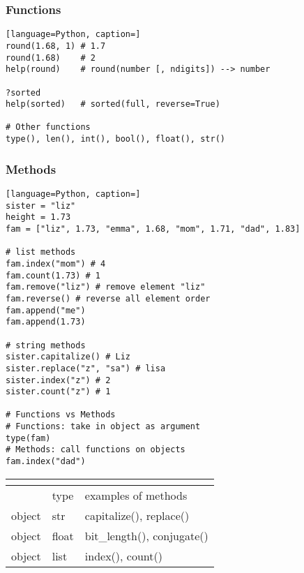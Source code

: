 \documentclass[12pt]{article}
\begin{document}
\subsubsection{\normalsize Functions}
\begin{lstlisting}[language=Python, caption=]
round(1.68, 1) # 1.7
round(1.68)    # 2
help(round)    # round(number [, ndigits]) --> number

?sorted
help(sorted)   # sorted(full, reverse=True)

# Other functions
type(), len(), int(), bool(), float(), str()
\end{lstlisting}

\subsubsection{\normalsize Methods}
\begin{lstlisting}[language=Python, caption=]
sister = "liz"
height = 1.73
fam = ["liz", 1.73, "emma", 1.68, "mom", 1.71, "dad", 1.83]

# list methods
fam.index("mom") # 4
fam.count(1.73) # 1
fam.remove("liz") # remove element "liz"
fam.reverse() # reverse all element order
fam.append("me")
fam.append(1.73)

# string methods
sister.capitalize() # Liz
sister.replace("z", "sa") # lisa
sister.index("z") # 2
sister.count("z") # 1

# Functions vs Methods
# Functions: take in object as argument
type(fam) 
# Methods: call functions on objects
fam.index("dad")
\end{lstlisting}

\begin{table}[!ht]
\centering

\begin{tabular}{c | l | l }
\multicolumn{2}{c}{} \\ [-10pt]
\hline
 & type & examples of methods \\
\hline
object & str & capitalize(), replace() \\
object & float & bit\_length(), conjugate() \\
object & list & index(), count() \\
\hline
\end{tabular}
\end{table}
\end{document}
